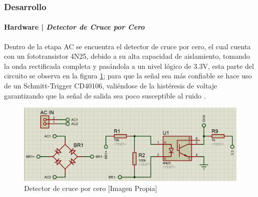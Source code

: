 \begin{frame}
\frametitle{Desarrollo}
\framesubtitle{Hardware | \emph{Detector de Cruce por Cero}}
\small
		Dentro de la etapa AC se encuentra el detector de cruce por cero, el cual cuenta con un fototransistor 4N25, debido a su alta capacidad de aislamiento, tomando la onda rectificada completa y pasándola a un nivel lógico de 3.3V, esta parte del circuito se observa en la figura \ref{fig:DC01}; para que la señal sea más confiable se hace uso de un Schmitt-Trigger CD40106, valiéndose de la histéresis de voltaje garantizando que la señal de salida sea poco susceptible al ruido \cite{DC0}.\\
		
		\begin{figure}
			\centering
			\caption{Detector de cruce por cero [Imagen Propia]}
			\label{fig:DC01}
			\includegraphics[width=0.65\linewidth]{Imagenes/DC01}
		\end{figure}
\end{frame}

